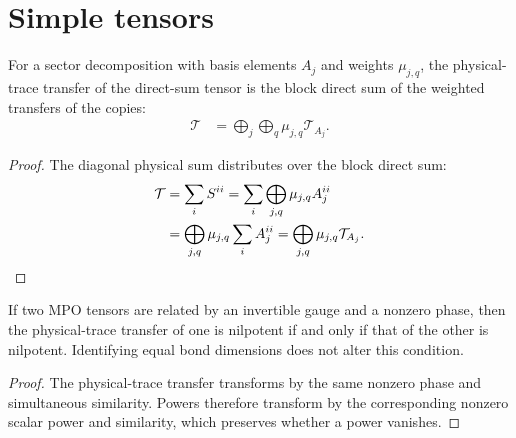 \section{Simple tensors}

\begin{lemma}
    \label{lem:mpdo_phys_trace_transfer_blockwise}
    \leanok
    For a sector decomposition with basis elements $A_{j}$ and weights
    $\mu_{j,q}$, the physical-trace transfer of the direct-sum tensor is the
    block direct sum of the weighted transfers of the copies:
    \begin{align}
        \mathcal T
         & =\bigoplus_{j}\bigoplus_{q}\mu_{j,q} \mathcal T_{A_{j}}.
        \label{eq:rfp_blockwise_transfer}
    \end{align}
\end{lemma}

\begin{proof}\leanok
    The diagonal physical sum distributes over the block direct sum:
    \begin{align}
        \mathcal T
         & =\sum_i S^{ii}
        =\sum_i\bigoplus_{j,q}\mu_{j,q}A_j^{ii}
        \notag                                      \\
         & =\bigoplus_{j,q}\mu_{j,q}\sum_i A_j^{ii}
        =\bigoplus_{j,q}\mu_{j,q}\mathcal T_{A_j}.
        \notag
    \end{align}
\end{proof}

\begin{lemma}
    \label{thm:mpdo_phys_trace_nilpotent_gauge_phase}
    \leanok
    If two MPO tensors are related by an invertible gauge and a
    nonzero phase, then the physical-trace transfer of one is nilpotent if and
    only if that of the other is nilpotent. Identifying equal bond dimensions
    does not alter this condition.
\end{lemma}

\begin{proof}\leanok
    The physical-trace transfer transforms by the same nonzero phase and
    simultaneous similarity. Powers therefore transform by the corresponding
    nonzero scalar power and similarity, which preserves whether a power
    vanishes.
\end{proof}

